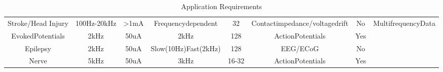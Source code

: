 \begin{table} 
    \begin{tabular}{ c c c c c c c c }
        Stroke/Head Injury & 100Hz-20kHz & >1mA & Frequencydependent & 32 & Contactimpedance/voltagedrift & No & MultifrequencyData \\ 
        EvokedPotentials & 2kHz & 50uA & 2kHz & 128 & ActionPotentials & Yes &  \\ 
        Epilepsy & 2kHz & 50uA & Slow(10Hz)Fast(2kHz) & 128 & EEG/ECoG & No &  \\ 
        Nerve & 5kHz & 50uA & 3kHz & 16-32 & ActionPotentials & Yes &  \\ 
    \end{tabular} 
    \caption{Application Requirements} 
\end{table}